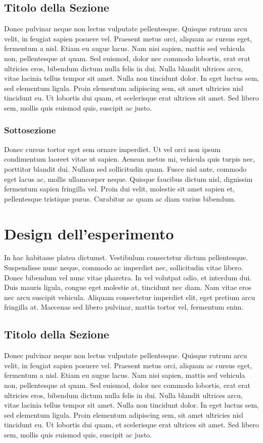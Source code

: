 \documentclass[target=mst,aauheader=,style=]{thud}
\begin{document}
\section{Titolo della Sezione}
Donec pulvinar neque non lectus vulputate pellentesque. Quisque rutrum arcu velit, in feugiat sapien posuere vel. Praesent metus orci, aliquam ac cursus eget, fermentum a nisl. Etiam eu augue lacus. Nam nisi sapien, mattis sed vehicula non, pellentesque at quam. Sed euismod, dolor nec commodo lobortis, erat erat ultricies eros, bibendum dictum nulla felis in dui. Nulla blandit ultrices arcu, vitae lacinia tellus tempor sit amet. Nulla non tincidunt dolor. In eget luctus sem, sed elementum ligula. Proin elementum adipiscing sem, sit amet ultricies nisl tincidunt eu. Ut lobortis dui quam, et scelerisque erat ultrices sit amet. Sed libero sem, mollis quis euismod quis, suscipit ac justo.

\subsection{Sottosezione}
Donec cursus tortor eget sem ornare imperdiet. Ut vel orci non ipsum condimentum laoreet vitae ut sapien. Aenean metus mi, vehicula quis turpis nec, porttitor blandit dui. Nullam sed sollicitudin quam. Fusce nisl ante, commodo eget lacus ac, mollis ullamcorper neque. Quisque faucibus dictum nisl, dignissim fermentum sapien fringilla vel. Proin dui velit, molestie sit amet sapien et, pellentesque tristique purus. Curabitur ac quam ac diam varius bibendum.

\chapter{Design dell'esperimento}
In hac habitasse platea dictumst. Vestibulum consectetur dictum pellentesque. Suspendisse nunc neque, commodo ac imperdiet nec, sollicitudin vitae libero. Donec bibendum vel nunc vitae pharetra. In vel volutpat odio, et interdum dui. Duis mauris ligula, congue eget molestie at, tincidunt nec diam. Nam vitae eros nec arcu suscipit vehicula. Aliquam consectetur imperdiet elit, eget pretium arcu fringilla at. Maecenas sed libero pulvinar, mattis tortor vel, fermentum enim.

\section{Titolo della Sezione}
Donec pulvinar neque non lectus vulputate pellentesque. Quisque rutrum arcu velit, in feugiat sapien posuere vel. Praesent metus orci, aliquam ac cursus eget, fermentum a nisl. Etiam eu augue lacus. Nam nisi sapien, mattis sed vehicula non, pellentesque at quam. Sed euismod, dolor nec commodo lobortis, erat erat ultricies eros, bibendum dictum nulla felis in dui. Nulla blandit ultrices arcu, vitae lacinia tellus tempor sit amet. Nulla non tincidunt dolor. In eget luctus sem, sed elementum ligula. Proin elementum adipiscing sem, sit amet ultricies nisl tincidunt eu. Ut lobortis dui quam, et scelerisque erat ultrices sit amet. Sed libero sem, mollis quis euismod quis, suscipit ac justo.
\end{document}
